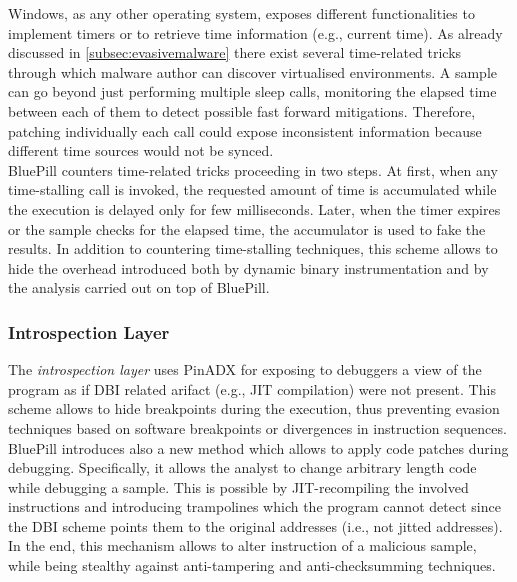 \documentclass[LaM,binding=0.6cm]{sapthesis}
\begin{document}
Windows, as any other operating system, exposes different functionalities to implement timers or to retrieve time information (e.g., current time). As already discussed in \autoref{subsec:evasivemalware} there exist several time-related tricks through which malware author can discover virtualised environments. A sample can go beyond just performing multiple sleep calls, monitoring the elapsed time between each of them to detect possible fast forward mitigations. Therefore, patching individually each call could expose inconsistent information because different time sources would not be synced.\\
BluePill counters time-related tricks proceeding in two steps. At first, when any time-stalling call is invoked, the requested amount of time is accumulated while the execution is delayed only for few milliseconds. Later, when the timer expires or the sample checks for the elapsed time, the accumulator is used to fake the results. In addition to countering time-stalling techniques, this scheme allows to hide the overhead introduced both by dynamic binary instrumentation and by the analysis carried out on top of BluePill.

\subsubsection{Introspection Layer}
The \textit{introspection layer} uses PinADX\cite{lueck2012pinadx} for exposing to debuggers a view of the program as if DBI related arifact (e.g., JIT compilation) were not present. This scheme allows to hide breakpoints during the execution, thus preventing evasion techniques based on software breakpoints or divergences in instruction sequences.\\
BluePill introduces also a new method which allows to apply code patches during debugging. Specifically, it allows the analyst to change arbitrary length code while debugging a sample. This is possible by JIT-recompiling the involved instructions and introducing trampolines which the program cannot detect since the DBI scheme points them to the original addresses (i.e., not jitted addresses). In the end, this mechanism allows to alter instruction of a malicious sample, while being stealthy against anti-tampering and anti-checksumming techniques.
\end{document}

